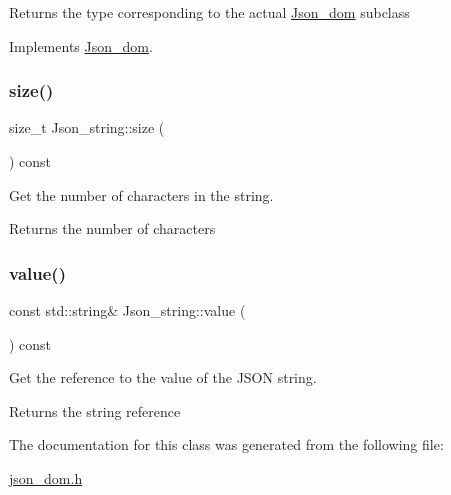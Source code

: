 \begin{DoxyReturn}{Returns}
the type corresponding to the actual \mbox{\hyperlink{classJson__dom}{Json\+\_\+dom}} subclass 
\end{DoxyReturn}


Implements \mbox{\hyperlink{classJson__dom_aed953eca1e112aade66511ad1bbf82b8}{Json\+\_\+dom}}.

\mbox{\label{classJson__string_af7a86637f23c483fd591d26387c205a2}} 
\subsubsection{\texorpdfstring{size()}{size()}}
{\footnotesize\ttfamily size\+\_\+t Json\+\_\+string\+::size (\begin{DoxyParamCaption}{ }\end{DoxyParamCaption}) const\hspace{0.3cm}{\ttfamily [inline]}}

Get the number of characters in the string. \begin{DoxyReturn}{Returns}
the number of characters 
\end{DoxyReturn}
\mbox{\label{classJson__string_a81118776d98491e24ea6606c1228b460}} 
\subsubsection{\texorpdfstring{value()}{value()}}
{\footnotesize\ttfamily const std\+::string\& Json\+\_\+string\+::value (\begin{DoxyParamCaption}{ }\end{DoxyParamCaption}) const\hspace{0.3cm}{\ttfamily [inline]}}

Get the reference to the value of the J\+S\+ON string. \begin{DoxyReturn}{Returns}
the string reference 
\end{DoxyReturn}


The documentation for this class was generated from the following file\+:\begin{DoxyCompactItemize}
\item 
\mbox{\hyperlink{json__dom_8h}{json\+\_\+dom.\+h}}\end{DoxyCompactItemize}
